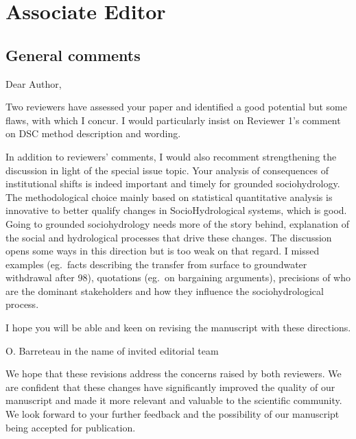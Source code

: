 \section*{Associate Editor}\label{editor}

\subsection*{General comments}
\RC*{} Dear Author,

\RC*{} Two reviewers have assessed your paper and identified a good potential but some flaws, with which I concur. I would particularly insist on Reviewer 1's comment on DSC method description and wording.

\RC*{} In addition to reviewers' comments, I would also recomment strengthening the discussion in light of the special issue topic. Your analysis of consequences of institutional shifts is indeed important and timely for grounded sociohydrology. The methodological choice mainly based on statistical quantitative analysis is innovative to better qualify changes in SocioHydrological systems, which is good. Going to grounded sociohydrology needs more of the story behind, explanation of the social and hydrological processes that drive these changes. The discussion opens some ways in this direction but is too weak on that regard. I missed examples (eg.\ facts describing the transfer from surface to groundwater withdrawal after 98), quotations (eg.\ on bargaining arguments), precisions of who are the dominant stakeholders and how they influence the sociohydrological process.

\RC*{} I hope you will be able and keen on revising the manuscript with these directions.

\RC*{} O. Barreteau in the name of invited editorial team

\AR*{} We hope that these revisions address the concerns raised by both reviewers. We are confident that these changes have significantly improved the quality of our manuscript and made it more relevant and valuable to the scientific community. We look forward to your further feedback and the possibility of our manuscript being accepted for publication.
